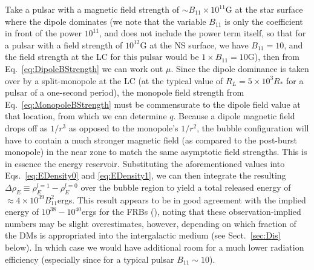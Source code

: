 \documentclass{aa}
\begin{document}
Take a pulsar with a magnetic field strength of $\sim B_{11}\times 10^{11}$G at the star surface where the dipole dominates (we note that the variable $B_{11}$ is only the coefficient in front of the power $10^{11}$, and does not include the power term itself, so that for a pulsar with a field strength of $10^{12}$G at the NS surface, we have $B_{11}=10$, and the field strength at the LC for this pulsar would be $1\times B_{11}=10$G), then from Eq.~\eqref{eq:DipoleBStrength} we can work out $\mu$. Since the dipole dominance is taken over by a split-monopole at the LC (at the typical value of $R_L=5\times 10^3 R_*$ for a pulsar of a one-second period), the monopole field strength from Eq.~\eqref{eq:MonopoleBStrength} must be commensurate to the dipole field value at that location, from which we can determine $q$. Because a dipole magnetic field drops off as $1/r^3$ as opposed to the monopole's $1/r^2$, the bubble configuration will have to contain a much stronger magnetic field (as compared to the post-burst monopole) in the near zone to match the same asymptotic field strengths. This is in essence the energy reservoir. Substituting the aforementioned values into Eqs.~\eqref{eq:EDensity0} and \eqref{eq:EDensity1}, we can then integrate the resulting $\Delta \rho_E \equiv \rho_E^{l=1}-\rho_E^{l=0}$ over the bubble region to yield a total released energy of $\approx 4\times 10^{39} B^2_{11}$ergs. This result appears to be in good agreement with the implied energy of $10^{38}-10^{40}$ergs for the FRBs (\cite{2016MPLA...3130013K}), noting that these observation-implied numbers may be slight overestimates, however, depending on which fraction of the DMs is appropriated into the intergalactic medium (see Sect.~\ref{sec:Dis} below). In which case we would have additional room for a much lower radiation efficiency (especially since for a typical pulsar $B_{11} \sim 10$).    
\end{document}
